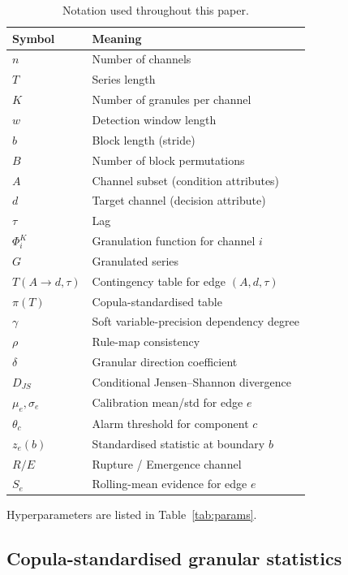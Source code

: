 \documentclass[11pt,a4paper]{article}
\begin{document}
\begin{table}[t]\centering\small
\caption{Notation used throughout this paper.}
\label{tab:symbols}
\begin{tabular}{ll}\hline
Symbol & Meaning \\ \hline
$n$ & Number of channels \\
$T$ & Series length \\
$K$ & Number of granules per channel \\
$w$ & Detection window length \\
$b$ & Block length (stride) \\
$B$ & Number of block permutations \\
$A$ & Channel subset (condition attributes) \\
$d$ & Target channel (decision attribute) \\
$\tau$ & Lag \\
$\Phi^K_i$ & Granulation function for channel $i$ \\
$G$ & Granulated series \\
$T(A{\to}d, \tau)$ & Contingency table for edge $(A, d, \tau)$ \\
$\pi(T)$ & Copula-standardised table \\
$\gamma$ & Soft variable-precision dependency degree \\
$\rho$ & Rule-map consistency \\
$\delta$ & Granular direction coefficient \\
$D_{JS}$ & Conditional Jensen--Shannon divergence \\
$\mu_e, \sigma_e$ & Calibration mean/std for edge $e$ \\
$\theta_c$ & Alarm threshold for component $c$ \\
$z_e(b)$ & Standardised statistic at boundary $b$ \\
$R / E$ & Rupture / Emergence channel \\
$S_e$ & Rolling-mean evidence for edge $e$ \\ \hline
\end{tabular}
\end{table}

Hyperparameters are listed in Table~\ref{tab:params}.

\subsection{Copula-standardised granular statistics}\label{sec:quad}
\end{document}
